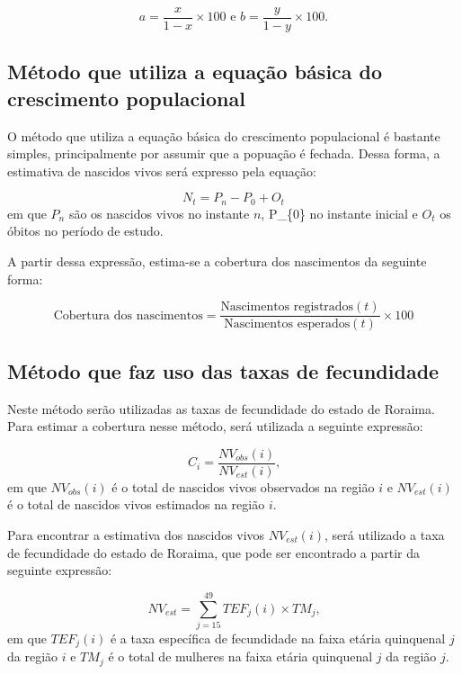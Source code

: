 \documentclass[
  12pt,
  a4paper,
]{scrreprt}
\begin{document}
\[
a = \frac{x}{1 - x} \times 100 \text{ e } b = \frac{y}{1-y}\times 100\text{.}
\]

\subsection{Método que utiliza a equação básica do crescimento
populacional}\label{muxe9todo-que-utiliza-a-equauxe7uxe3o-buxe1sica-do-crescimento-populacional}

O método que utiliza a equação básica do crescimento populacional é
bastante simples, principalmente por assumir que a popuação é fechada.
Dessa forma, a estimativa de nascidos vivos será expresso pela equação:

\[
N_t = P_n - P_{0} + O_t
\] em que \(P_n\) são os nascidos vivos no instante \(n\), P\_\{0\} no
instante inicial e \(O_t\) os óbitos no período de estudo.

\vspace{12pt}

A partir dessa expressão, estima-se a cobertura dos nascimentos da
seguinte forma:

\[
\text{Cobertura dos nascimentos} = \frac{\text{Nascimentos registrados}\left(t\right)}{\text{Nascimentos esperados}\left(t\right)} \times 100
\]

\subsection{Método que faz uso das taxas de
fecundidade}\label{muxe9todo-que-faz-uso-das-taxas-de-fecundidade}

Neste método serão utilizadas as taxas de fecundidade do estado de
Roraima. Para estimar a cobertura nesse método, será utilizada a
seguinte expressão:

\[
C_i = \frac{NV_{obs}\left(i\right)}{NV_{est}\left(i\right)} \text{,}
\] em que \(NV_{obs}\left(i\right)\) é o total de nascidos vivos
observados na região \(i\) e \(NV_{est}\left(i\right)\) é o total de
nascidos vivos estimados na região \(i\).

\vspace{12pt}

Para encontrar a estimativa dos nascidos vivos
\(NV_{est}\left(i\right)\), será utilizado a taxa de fecundidade do
estado de Roraima, que pode ser encontrado a partir da seguinte
expressão:

\[
NV_{est} = \sum^{49}_{j=15} TEF_{j}\left(i\right) \times TM_{j} \text{,}
\] em que \(TEF_{j}\left(i\right)\) é a taxa específica de fecundidade
na faixa etária quinquenal \(j\) da região \(i\) e \(TM_j\) é o total de
mulheres na faixa etária quinquenal \(j\) da região \(j\).
\end{document}
